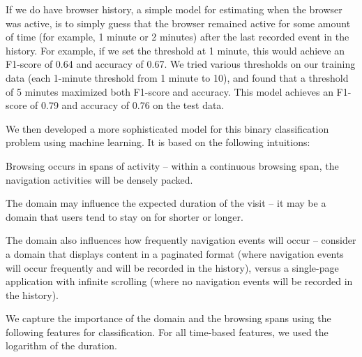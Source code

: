 \documentclass{sigchi}
\begin{document}
If we do have browser history, a simple model for estimating when the browser was active, is to simply guess that the browser remained active for some amount of time (for example, 1 minute or 2 minutes) after the last recorded event in the history. For example, if we set the threshold at 1 minute, this would achieve an F1-score of 0.64 and accuracy of 0.67. We tried various thresholds on our training data (each 1-minute threshold from 1 minute to 10), and found that a threshold of 5 minutes maximized both F1-score and accuracy. This model achieves an F1-score of 0.79 and accuracy of 0.76 on the test data.






We then developed a more sophisticated model for this binary classification problem using machine learning. It is based on the following intuitions:

\begin{compactitem}
	\item Browsing occurs in spans of activity -- within a continuous browsing span, the navigation activities will be densely packed.
	\item The domain may influence the expected duration of the visit -- it may be a domain that users tend to stay on for shorter or longer.
	\item The domain also influences how frequently navigation events will occur -- consider a domain that displays content in a paginated format (where navigation events will occur frequently and will be recorded in the history), versus a single-page application with infinite scrolling (where no navigation events will be recorded in the history).
\end{compactitem}

We capture the importance of the domain and the browsing spans using the following features for classification. For all time-based features, we used the logarithm of the duration.
\end{document}
